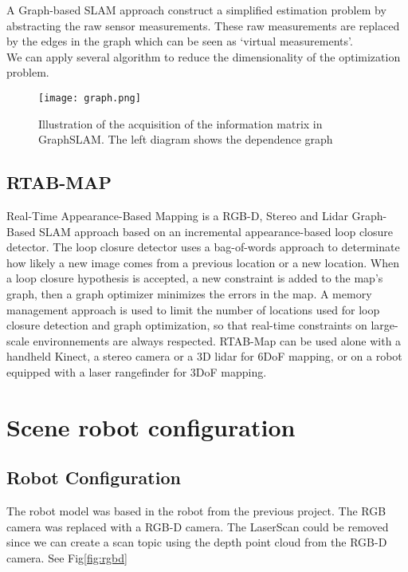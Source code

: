 \documentclass[10pt,journal,compsoc]{IEEEtran}
\begin{document}
A Graph-based SLAM approach construct a simplified estimation problem by abstracting the raw sensor measurements. These
raw measurements are replaced by the edges in the graph which can be seen as `virtual measurements'.\\
We can apply several algorithm to reduce the dimensionality of the optimization problem.\cite{Thrun2006a}

\begin{figure}[thpb]
      \centering
      \texttt{[image: graph.png]}
      \caption{Illustration of the acquisition of the information matrix in GraphSLAM. The left diagram shows the
      dependence graph \cite{Thrun2006a}}
      \label{fig:graph}
\end{figure}

\subsection{RTAB-MAP}

Real-Time Appearance-Based Mapping is a RGB-D, Stereo and Lidar Graph-Based SLAM approach based on an incremental appearance-based loop closure detector. The loop closure detector uses a bag-of-words approach to determinate how likely a new image comes from a previous location or a new location. When a loop closure hypothesis is accepted, a new constraint is added to the map’s graph, then a graph optimizer minimizes the errors in the map. A memory management approach is used to limit the number of locations used for loop closure detection and graph optimization, so that real-time constraints on large-scale environnements are always respected. RTAB-Map can be used alone with a handheld Kinect, a stereo camera or a 3D lidar for 6DoF mapping, or on a robot equipped with a laser rangefinder for 3DoF mapping.

\section{Scene robot configuration}
\subsection{Robot Configuration}


The robot model was based in the robot from the previous project. The RGB camera was replaced with a RGB-D camera. The
LaserScan could be removed since we can create a scan topic using the depth point cloud from the RGB-D camera. See
Fig\ref{fig:rgbd}
\end{document}
